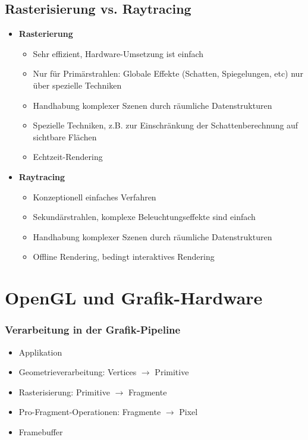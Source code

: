 \subsection{Rasterisierung vs. Raytracing}
\begin{itemize}
	\item \textbf{Rasterierung}
	\begin{itemize}
		\item Sehr effizient, Hardware-Umsetzung ist einfach
		\item Nur für Primärstrahlen: Globale Effekte (Schatten, Spiegelungen, etc) nur über spezielle Techniken
		\item Handhabung komplexer Szenen durch räumliche Datenstrukturen
		\item Spezielle Techniken, z.B. zur Einschränkung der Schattenberechnung auf sichtbare Flächen
		\item Echtzeit-Rendering
	\end{itemize}
	\item \textbf{Raytracing}
	\begin{itemize}
		\item Konzeptionell einfaches Verfahren
		\item Sekundärstrahlen, komplexe Beleuchtungseffekte sind einfach
		\item Handhabung komplexer Szenen durch räumliche Datenstrukturen
		\item Offline Rendering, bedingt interaktives Rendering
	\end{itemize}
\end{itemize}



\section{OpenGL und Grafik-Hardware}

\subsubsection{Verarbeitung in der Grafik-Pipeline}
\begin{itemize}
	\item Applikation
	\item Geometrieverarbeitung: Vertices \(\rightarrow\) Primitive
	\item Rasterisierung: Primitive \(\rightarrow\) Fragmente
	\item Pro-Fragment-Operationen: Fragmente \(\rightarrow\) Pixel
	\item Framebuffer
\end{itemize}


